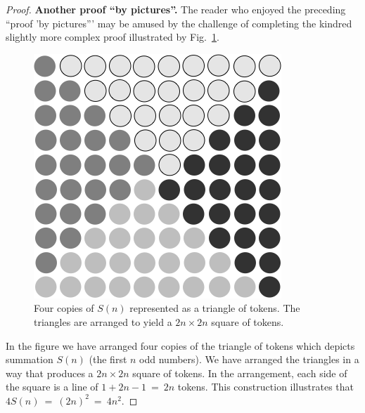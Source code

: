 \begin{proof}
{\bf Another proof ``by pictures''.}
%
The reader who enjoyed the preceding ``proof 'by pictures''' may be amused by
the challenge of completing the kindred slightly more complex proof illustrated by
Fig.~\ref{fig:anotherSumOdds}.
\begin{figure}[ht]
\begin{center}
       \includegraphics[scale=0.4]{FiguresMaths/Deltaodd}
\caption{Four copies of $S(n)$ represented as a triangle of tokens.
  The triangles are arranged to yield a $2n \times 2n$ square of
  tokens.}
       \label{fig:anotherSumOdds}
\end{center}
\end{figure}
In the figure we have arranged four copies of the triangle of tokens which
depicts summation $S(n)$ (the first $n$ odd numbers).  We have arranged
the triangles in a way that produces a $2n \times 2n$ square of tokens.  In the
arrangement, each side of the square is a line of $1+2n-1 \ = \ 2n$ tokens.  This
construction illustrates that $4 S(n) \ = \ (2n)^2  \ = \ 4n^2$.
\end{proof}
\medskip

